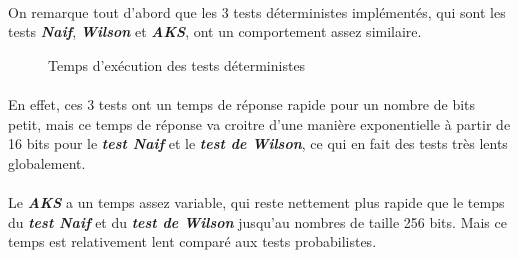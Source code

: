 			\paragraph{} On remarque tout d'abord que les 3 tests déterministes implémentés, qui sont les tests \textit{\textbf{Naif}}, \textit{\textbf{Wilson}} et \textit{\textbf{AKS}}, ont un comportement assez similaire.
			
			\begin{figure}[H]\vspace{-1em}\caption{Temps d'exécution des tests déterministes}\label{fig:M5}\end{figure}
			
			\paragraph{} En effet, ces 3 tests ont un temps de réponse rapide pour un nombre de bits petit, mais ce temps de réponse va croitre d'une manière exponentielle à partir de 16 bits pour le \textit{\textbf{test Naif}} et le \textit{\textbf{test de Wilson}}, ce qui en fait des tests très lents globalement. 
			
			\paragraph{} Le \textit{\textbf{AKS}} a un temps assez variable, qui reste nettement plus rapide que le temps du \textit{\textbf{test Naif}} et du \textit{\textbf{test de Wilson}} jusqu'au nombres de taille 256 bits. Mais ce temps est relativement lent comparé aux tests probabilistes.
			
